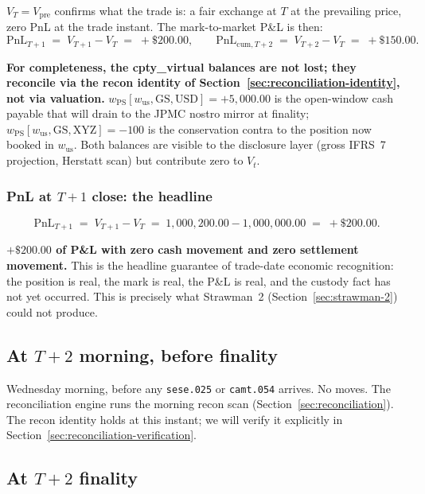 \documentclass[11pt,a4paper]{article}
\begin{document}
$V_T = V_{\mathrm{pre}}$ confirms what the trade is: a fair exchange at $T$ at the prevailing price, zero PnL at the trade instant. The mark-to-market P\&L is then:
\[
\mathrm{PnL}_{T+1} \;=\; V_{T+1} - V_T \;=\; +\$200.00, \qquad \mathrm{PnL}_{\mathrm{cum}, T+2} \;=\; V_{T+2} - V_T \;=\; +\$150.00.
\]

\textbf{For completeness, the cpty\_virtual balances are not lost; they reconcile via the recon identity of Section~\ref{sec:reconciliation-identity}, not via valuation.} $w_{\mathrm{PS}}[w_{\mathrm{us}}, \mathrm{GS}, \mathrm{USD}] = +5{,}000.00$ is the open-window cash payable that will drain to the JPMC nostro mirror at finality; $w_{\mathrm{PS}}[w_{\mathrm{us}}, \mathrm{GS}, \mathrm{XYZ}] = -100$ is the conservation contra to the position now booked in $w_{\mathrm{us}}$. Both balances are visible to the disclosure layer (gross IFRS~7 projection, Herstatt scan) but contribute zero to $V_t$.

\subsubsection*{PnL at $T+1$ close: the headline}

\[
\mathrm{PnL}_{T+1} \;=\; V_{T+1} - V_T \;=\; 1{,}000{,}200.00 - 1{,}000{,}000.00 \;=\; +\$200.00.
\]

\textbf{$+\$200.00$ of P\&L with zero cash movement and zero settlement movement.} This is the headline guarantee of trade-date economic recognition: the position is real, the mark is real, the P\&L is real, and the custody fact has not yet occurred. This is precisely what Strawman~2 (Section~\ref{sec:strawman-2}) could not produce.

\subsection{At $T+2$ morning, before finality}
\label{sec:buy-T2-morning}

Wednesday morning, before any \texttt{sese.025} or \texttt{camt.054} arrives. No moves. The reconciliation engine runs the morning recon scan (Section~\ref{sec:reconciliation}). The recon identity holds at this instant; we will verify it explicitly in Section~\ref{sec:reconciliation-verification}.

\subsection{At $T+2$ finality}
\label{sec:buy-T2-finality}
\end{document}
